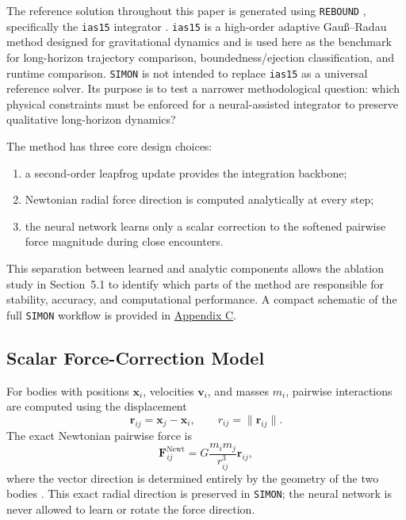 \documentclass[12pt]{article}
\begin{document}
The reference solution throughout this paper is generated using \texttt{REBOUND}
\citep{Rein2012}, specifically the \texttt{ias15} integrator \citep{Rein_2014}. \texttt{ias15}
is a high-order adaptive Gau\ss--Radau method designed for gravitational dynamics and is
used here as the benchmark for long-horizon trajectory comparison, boundedness/ejection
classification, and runtime comparison. \texttt{SIMON} is not intended to replace
\texttt{ias15} as a universal reference solver. Its purpose is to test a narrower methodological
question: which physical constraints must be enforced for a neural-assisted integrator to
preserve qualitative long-horizon dynamics?

The method has three core design choices:
\begin{enumerate}
    \item a second-order leapfrog update provides the integration backbone;
    \item Newtonian radial force direction is computed analytically at every step;
    \item the neural network learns only a scalar correction to the softened pairwise force
    magnitude during close encounters.
\end{enumerate}
This separation between learned and analytic components allows the ablation study in
Section~5.1 to identify which parts of the method are responsible for stability, accuracy,
and computational performance. A compact schematic of the full \texttt{SIMON} workflow is provided in
\hyperref[app:simon_architecture]{Appendix C}.

\subsection{Scalar Force-Correction Model}

For bodies with positions $\mathbf{x}_i$, velocities $\mathbf{v}_i$, and masses $m_i$, pairwise
interactions are computed using the displacement
\[
\mathbf{r}_{ij}=\mathbf{x}_j-\mathbf{x}_i,\qquad
r_{ij}=\|\mathbf{r}_{ij}\|.
\]
The exact Newtonian pairwise force is
\[
\mathbf{F}_{ij}^{\mathrm{Newt}}
=
G\frac{m_i m_j}{r_{ij}^3}\mathbf{r}_{ij},
\]
where the vector direction is determined entirely by the geometry of the two bodies
\cite{murray1999solar}. This exact radial direction is preserved in \texttt{SIMON}; the neural
network is never allowed to learn or rotate the force direction.
\end{document}
